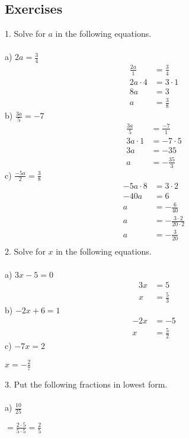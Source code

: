 \documentclass[12pt]{article}
\begin{document}
\subsection*{Exercises}
1. Solve for $a$ in the following equations. \\
\\
a) $2a=\displaystyle \frac{3}{4}$
\begin{align*}
\displaystyle \frac{2a}{1}&=\displaystyle \frac{3}{4} \\
2a\cdot4&=3\cdot1 \\
8a&=3 \\
a&=\displaystyle \frac{3}{8}
\end{align*}
b) $\displaystyle \frac{3a}{5}=-7$
\begin{align*}
\displaystyle \frac{3a}{5}&=\displaystyle \frac{-7}{1} \\
3a\cdot1&=-7\cdot5 \\
3a&=-35 \\
a&=-\displaystyle \frac{35}{3}
\end{align*}
c) $\displaystyle \frac{-5a}{2}=\displaystyle \frac{3}{8}$
\begin{align*}
-5a\cdot8&=3\cdot2 \\
-40a&=6 \\
a&=-\displaystyle \frac{6}{40} \\
a&=-\displaystyle \frac{3\cdot2}{20\cdot2} \\
a&=-\displaystyle \frac{3}{20} \\
\end{align*}
2. Solve for $x$ in the following equations. \\
\\
a) $3x-5=0$
\begin{align*}
3x&=5 \\
x&=\displaystyle \frac{5}{3}
\end{align*}
b) $-2x+6=1$
\begin{align*}
-2x&=-5 \\
x&=\displaystyle \frac{5}{2}
\end{align*}
c) $-7x=2$
\begin{center}
$x=-\displaystyle \frac{2}{7}$
\end{center}
3. Put the following fractions in lowest form. \\
\\
a) $\displaystyle \frac{10}{25}$
\begin{center}
$=\displaystyle \frac{2\cdot5}{5\cdot5}=\displaystyle \frac{2}{5}$
\end{center}
\end{document}
